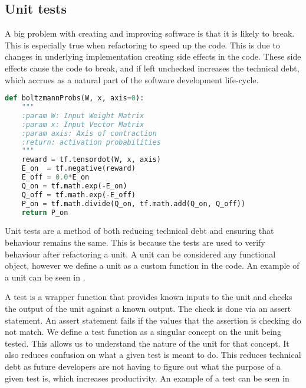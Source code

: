 
\subsection{Unit tests}
\label{subsec:unittest}
{
A big problem with creating and improving software is that it is likely to break.
This is especially true when refactoring to speed up the code.
This is due to changes in underlying implementation creating side effects in the code.
These side effects cause the code to break, and if left unchecked increases the technical debt, which accrues as a natural part of the software development life-cycle.

\begin{minipage}{\linewidth}
\begin{lstlisting}[caption=Example unit to be tested, label=code:unit, language=python]
def boltzmannProbs(W, x, axis=0):
    """
    :param W: Input Weight Matrix
    :param x: Input Vector Matrix
    :param axis: Axis of contraction
    :return: activation probabilities
    """
    reward = tf.tensordot(W, x, axis)
    E_on  = tf.negative(reward)
    E_off = 0.0*E_on
    Q_on = tf.math.exp(-E_on)
    Q_off = tf.math.exp(-E_off)
    P_on = tf.math.divide(Q_on, tf.math.add(Q_on, Q_off))
    return P_on
\end{lstlisting}
\end{minipage}

Unit tests are a method of both reducing technical debt and ensuring that behaviour remains the same.
This is because the tests are used to verify behaviour after refactoring a unit.
A unit can be considered any functional object, however we define a unit as a custom function in the code.
An example of a unit can be seen in .
}



{
A test is a wrapper function that provides known inputs to the unit and checks the output of the unit against a known output.
The check is done via an assert statement.
An assert statement fails if the values that the assertion is checking do not match.
We define a test function as a singular concept on the unit being tested.
This allows us to understand the nature of the unit for that concept.
It also reduces confusion on what a given test is meant to do.
This reduces technical debt as future developers are not having to figure out what the 
purpose of a given test is, which increases productivity.
An example of a test can be seen in 
}



